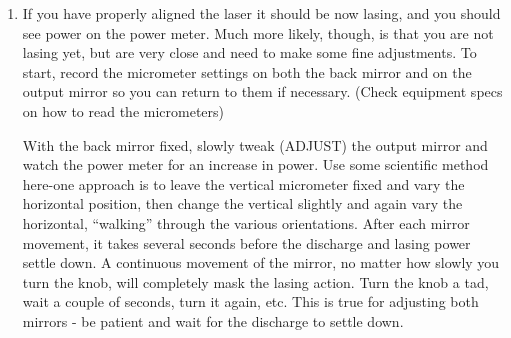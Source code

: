 \documentclass{../lab}
\begin{document}
\begin{enumerate}
    \textbf{To turn off high voltage}

    \begin{enumerate}
        \item Flip both regulator power switches off and then on. This cuts off HV power to the two halves of the laser tube.
    
        \item Turn HV down to zero. DO NOT TURN OFF REGULATORS YET!
        
        \item Wait until HV meter on High voltage power supply reads zero. Then shut off the HV power supply and regulators.
        
        \textbf{CAUTION}: The high voltage bleeds off slowly, so all points are still electrically hot for several minutes. Don't touch them without supervision or prior instruction.
        
        \item When you are done for the day, Shut off water, \textbf{first} the BLUE handle, then the RED handle, one right after the other, and then the supply faucet across the hall in room 286. Also turn off all power meters and detector and all other electrical devices \emph{except the vacuum pump}, which you should leave running with all valves closed in the vacuum lines, etc.
    \end{enumerate}
    
    \item If you have properly aligned the laser it should be now lasing, and you should see power on the power meter. Much more likely, though, is that you are not lasing yet, but are very close and need to make some fine adjustments. To start, record the micrometer settings on both the back mirror and on the output mirror so you can return to them if necessary. (Check equipment specs on how to read the micrometers)
    
    With the back mirror fixed, slowly tweak (ADJUST) the output mirror and watch the power meter for an increase in power. Use some scientific method here-one approach is to leave the vertical micrometer fixed and vary the horizontal position, then change the vertical slightly and again vary the horizontal, ``walking'' through the various orientations. After each mirror movement, it takes several seconds before the discharge and lasing power settle down. A continuous movement of the mirror, no matter how slowly you turn the knob, will completely mask the lasing action. Turn the knob a tad, wait a couple of seconds, turn it again, etc. This is true for adjusting both mirrors - be patient and wait for the discharge to settle down.
    

\end{enumerate}
\end{document}
